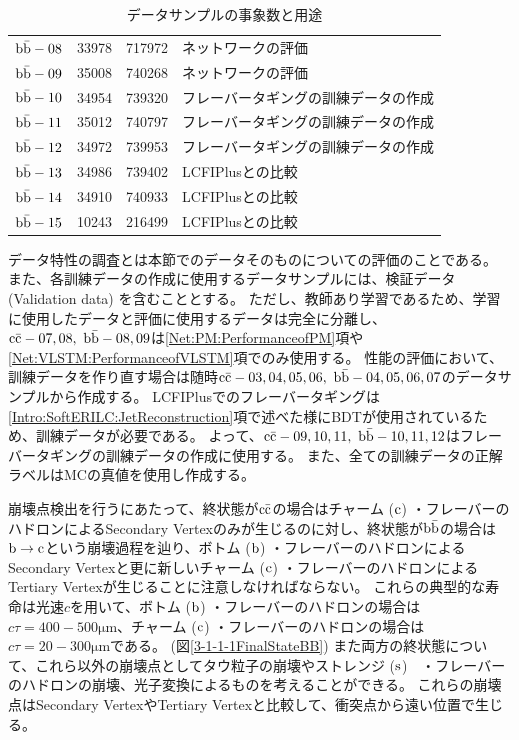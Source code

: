 \begin{table}[htb]
\begin{tabular}{c c c l}
    $\rm b\bar{b}-08$ & 33978 & 717972 & ネットワークの評価\\ 
    $\rm b\bar{b}-09$ & 35008 & 740268 & ネットワークの評価\\ \hline
    $\rm b\bar{b}-10$ & 34954 & 739320 & フレーバータギングの訓練データの作成\\ 
    $\rm b\bar{b}-11$ & 35012 & 740797 & フレーバータギングの訓練データの作成\\ 
    $\rm b\bar{b}-12$ & 34972 & 739953 & フレーバータギングの訓練データの作成\\ \hline
    $\rm b\bar{b}-13$ & 34986 & 739402 & LCFIPlusとの比較\\ 
    $\rm b\bar{b}-14$ & 34910 & 740933 & LCFIPlusとの比較\\ 
    $\rm b\bar{b}-15$ & 10243 & 216499 & LCFIPlusとの比較\\ \hline
  \end{tabular}
  \caption{データサンプルの事象数と用途}
  \label{DataSamples}
\end{table}

データ特性の調査とは本節でのデータそのものについての評価のことである。
また、各訓練データの作成に使用するデータサンプルには、検証データ (Validation data) を含むこととする。
ただし、教師あり学習であるため、学習に使用したデータと評価に使用するデータは完全に分離し、$\rm c\bar{c}-07,08,\ \rm b\bar{b}-08,09$は\ref{Net:PM:PerformanceofPM}項や\ref{Net:VLSTM:PerformanceofVLSTM}項でのみ使用する。
性能の評価において、訓練データを作り直す場合は随時$\rm c\bar{c}-03,04,05,06,\ \rm b\bar{b}-04,05,06,07$のデータサンプルから作成する。
LCFIPlusでのフレーバータギングは\ref{Intro:SoftERILC:JetReconstruction}項で述べた様にBDTが使用されているため、訓練データが必要である。
よって、$\rm c\bar{c}-09,10,11,\ \rm b\bar{b}-10,11,12$はフレーバータギングの訓練データの作成に使用する。
また、全ての訓練データの正解ラベルはMCの真値を使用し作成する。

崩壊点検出を行うにあたって、終状態が$\rm c\bar{c}$の場合はチャーム ($\rm c$) ・フレーバーのハドロンによるSecondary Vertexのみが生じるのに対し、終状態が$\rm b\bar{b}$の場合は$\rm b \to c$という崩壊過程を辿り、ボトム ($\rm b$) ・フレーバーのハドロンによるSecondary Vertexと更に新しいチャーム ($\rm c$) ・フレーバーのハドロンによるTertiary Vertexが生じることに注意しなければならない。
これらの典型的な寿命は光速$c$を用いて、ボトム ($\rm b$) ・フレーバーのハドロンの場合は$c \tau = 400-500 \mathrm{\mu m}$、チャーム ($\rm c$) ・フレーバーのハドロンの場合は$c \tau = 20-300 \mathrm{\mu m}$である。 (図\ref{3-1-1-1FinalStateBB})
また両方の終状態について、これら以外の崩壊点としてタウ粒子の崩壊やストレンジ ($\rm s$)　・フレーバーのハドロンの崩壊、光子変換によるものを考えることができる。
これらの崩壊点はSecondary VertexやTertiary Vertexと比較して、衝突点から遠い位置で生じる。

